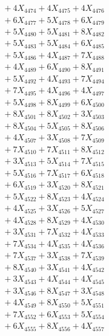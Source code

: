 \documentclass[a4paper,10pt]{article}
\begin{document}
{\begin{align}
&\;  + 4 X_{4474} + 4 X_{4475} + 4 X_{4476} \\[0.3ex]
&\;  + 6 X_{4477} + 5 X_{4478} + 6 X_{4479} \\[0.5ex]\allowbreak
&\;  + 5 X_{4480} + 5 X_{4481} + 8 X_{4482} \\[0.3ex]
&\;  + 5 X_{4483} + 5 X_{4484} + 6 X_{4485} \\[0.3ex]
&\;  + 5 X_{4486} + 4 X_{4487} + 7 X_{4488} \\[0.3ex]
&\;  + 4 X_{4489} + 6 X_{4490} + 8 X_{4491} \\[0.3ex]
&\;  + 5 X_{4492} + 4 X_{4493} + 7 X_{4494} \\[0.3ex]
&\;  + 7 X_{4495} + 4 X_{4496} + 4 X_{4497} \\[0.3ex]
&\;  + 5 X_{4498} + 8 X_{4499} + 6 X_{4500} \\[0.3ex]
&\;  + 8 X_{4501} + 8 X_{4502} + 3 X_{4503} \\[0.3ex]
&\;  + 8 X_{4504} + 5 X_{4505} + 8 X_{4506} \\[0.3ex]
&\;  + 4 X_{4507} + 3 X_{4508} + 7 X_{4509} \\[0.5ex]\allowbreak
&\;  + 7 X_{4510} + 7 X_{4511} + 8 X_{4512} \\[0.3ex]
&\;  + 3 X_{4513} + 5 X_{4514} + 7 X_{4515} \\[0.3ex]
&\;  + 5 X_{4516} + 7 X_{4517} + 6 X_{4518} \\[0.3ex]
&\;  + 6 X_{4519} + 3 X_{4520} + 8 X_{4521} \\[0.3ex]
&\;  + 5 X_{4522} + 8 X_{4523} + 4 X_{4524} \\[0.3ex]
&\;  + 4 X_{4525} + 3 X_{4526} + 5 X_{4527} \\[0.3ex]
&\;  + 4 X_{4528} + 8 X_{4529} + 4 X_{4530} \\[0.3ex]
&\;  + 3 X_{4531} + 7 X_{4532} + 4 X_{4533} \\[0.3ex]
&\;  + 7 X_{4534} + 4 X_{4535} + 4 X_{4536} \\[0.3ex]
&\;  + 7 X_{4537} + 3 X_{4538} + 7 X_{4539} \\[0.5ex]\allowbreak
&\;  + 8 X_{4540} + 3 X_{4541} + 4 X_{4542} \\[0.3ex]
&\;  + 3 X_{4543} + 4 X_{4544} + 4 X_{4545} \\[0.3ex]
&\;  + 3 X_{4546} + 8 X_{4547} + 3 X_{4548} \\[0.3ex]
&\;  + 4 X_{4549} + 8 X_{4550} + 5 X_{4551} \\[0.3ex]
&\;  + 7 X_{4552} + 6 X_{4553} + 5 X_{4554} \\[0.3ex]
&\;  + 6 X_{4555} + 8 X_{4556} + 4 X_{4557} \\[0.3ex]

\end{align}}
\end{document}
